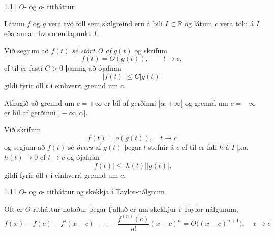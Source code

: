 %
\begin{frame}{1.11 $O$- og $o$- ritháttur}

 
Látum $f$ og $g$ vera tvö föll sem skilgreind eru á bili $I \subset
\mathbb{R}$  og látum $c$ vera tölu á $I$ eða annan hvorn endapunkt $I$. 
\pause

Við segjum að $f(t)$ {\it sé stórt O
  af} $g(t)$ og skrifum 
\begin{equation*}
    f(t) = O(g(t)), \qquad t \rightarrow c,
\end{equation*}
ef til er fasti $C>0$ þannig að ójafnan
\begin{equation*}
    |f(t)| \leq C|g(t)|
\end{equation*}
gildi fyrir öll $t$ í einhverri grennd um $c$. 

\pause
\smallskip
Athugið
að grennd um $c=+\infty$ er bil af gerðinni $]\alpha,+\infty[$ og
grennd um $c=-\infty$ er bil af gerðinni $]-\infty,\alpha[$. 

\pause
\smallskip
Við skrifum 
\begin{equation*}
    f(t) = o(g(t)), \quad t \rightarrow c
\end{equation*}
og segjum að $f(t)$ sé {\it óvera} af $g(t)$ þegar $t$ stefnir á $c$
ef  til er fall $h$ á $I$ þ.a. $h(t) \to 0$ ef $t\to c$ og ójafnan  
\begin{equation*}
    |f(t)| \leq |h(t)||g(t)|,
\end{equation*}
gildi fyrir öll $t$ í einhverri grennd um $c$.

\end{frame}
%

%
\begin{frame}{1.11 $O$- og $o$- ritháttur og skekkja í Taylor-nálgnum} 


Oft er $O$-ritháttur notaður þegar fjallað er um skekkjur í
Taylor-nálgunum,
\begin{equation*}
    f(x) - f(c) - f'(x-c) - \cdots 
    - \frac{f^{(n)}(c)}{n!}(x-c)^n =
    O\big((x-c)^{n+1}\big),  \quad x \to c
\end{equation*}
\end{frame}
%

